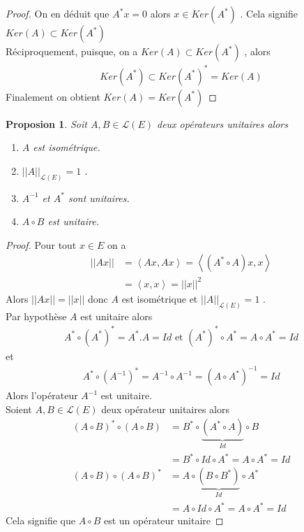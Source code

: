 \documentclass{report}
\newtheorem{Prop}{Proposion}[subsection]
\begin{document}
{\begin{proof}
On en déduit que $A^* x = 0$ alors $x \in Ker(A^*)$ . Cela signifie $Ker(A) \subset Ker(A^*)$ \\
Réciproquement, puisque, on a $Ker(A) \subset Ker(A^*)$ , alors 
					\begin{align*}
					 Ker(A^*) \subset Ker(A^*)^* = Ker(A) 
					\end{align*}
Finalement on obtient $Ker(A) = Ker(A^*)$ 
\end{proof}


\begin{Prop} Soit $A,B \in \mathscr{L}(E)$ deux opérateurs unitaires alors \\
	\begin{enumerate}
	\item $A$ est isométrique.\\
	\item $||A||_{\mathscr{L}(E)} = 1$ .\\
	\item $A^{-1}$ et $A^*$ sont unitaires.\\
	\item $A \circ B$ est unitaire.\\
	\end{enumerate}
\end{Prop}
\begin{proof}
 Pour tout $x \in E$ on a 
					\begin{align*}
					 ||A x|| &= \left< Ax,Ax \right> = \left< (A^*\circ A)x,x \right> \\
					 &= \left< x,x \right> = ||x||^2
					\end{align*}
Alors $||Ax|| = ||x||$ donc $A$ est isométrique et $||A||_{\mathscr{L}(E)} = 1$ .\\
 Par hypothèse $A$ est unitaire alors 
					\begin{align*}
					 A^* \circ (A^*)^* = A^* . A = Id \,\,\text{et}\,\, (A^*)^* \circ A^* = A \circ A^* = Id 
					\end{align*}
et 
					\begin{align*}
					 A^* \circ (A^{-1})^* = A^{-1} \circ A^{-1} = (A\circ A^*)^{-1} = Id 
					\end{align*}
Alors l'opérateur $A^{-1}$ est unitaire.\\
 Soient $A,B \in \mathscr{L}(E)$ deux opérateur unitaires alors 
					\begin{align*}
					 (A\circ B)^* \circ (A\circ B) &= B^* \circ \underbrace{(A^* \circ A)}_{Id} \circ B   \\ 
					 &= B^*\circ Id \circ A^* = A \circ A^* = Id \\
					 (A\circ B)\circ (A\circ B)^* &= A\circ \underbrace{(B\circ B^*)}_{Id} \circ A^* \\
					 &= A\circ Id \circ A^* = A\circ A^* = Id 
					\end{align*}
Cela signifie que $A\circ B$ est un opérateur unitaire 
\end{proof}






}
\end{document}
